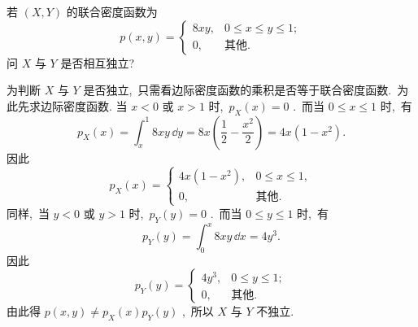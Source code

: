    \begin{example}\label{exam:3.2.7}
   	若 $(X,Y)$ 的联合密度函数为
   	\begin{equation*}
   		p(x,y)=
   		\begin{cases}
   		8xy, & 0\leqslant x\leqslant y\leqslant1;\\
   		0, & \text{其他}.
   		\end{cases}
   	\end{equation*}
   	问 $X$ 与 $Y$ 是否相互独立?
   \end{example}
   \begin{solution}
   	为判断 $X$ 与 $Y$ 是否独立,\ 只需看边际密度函数的乘积是否等于联合密度函数.\ 为此先求边际密度函数.
   	当 $x<0$ 或 $x>1$ 时,\ $p_{X}(x)=0$ .\ 而当 $0\leqslant x\leqslant1$ 时,\ 有
   	\begin{equation*}
   		p_{X}(x)=\int_{x}^{1}8xy\,\dd y=8x\left(\frac{1}{2}-\frac{x^2}{2}\right)=4x\left(1-x^2\right).
   	\end{equation*}
   	因此
   	\begin{equation*}
   		p_{X}(x)=
   		\begin{cases}
   		4x\left(1-x^2\right), & 0\leqslant x\leqslant1,\\
   		0, & \text{其他}.
   		\end{cases}
   	\end{equation*}
   	同样,\ 当 $y<0$ 或 $y>1$ 时,\ $p_{Y}(y)=0$ .\ 而当 $0\leqslant y\leqslant 1$ 时,\ 有
   	\begin{equation*}
   		p_{Y}(y)=\int_{0}^{x}8xy\,\dd x=4y^3.
   	\end{equation*}
   	因此
   	\begin{equation*}
   		p_{Y}(y)=
   		\begin{cases}
   		4y^3, & 0\leqslant y\leqslant1;\\
   		0, & \text{其他}.
   		\end{cases}
   	\end{equation*}
   	由此得 $p(x,y)\ne p_{X}(x)p_{Y}(y)$ ,\ 所以 $X$ 与 $Y$ 不独立.
   \end{solution}

